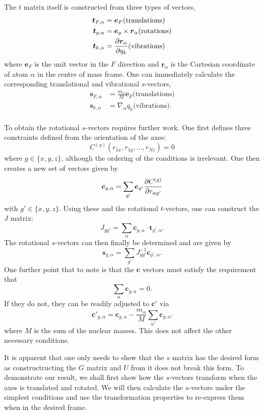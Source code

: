\documentclass{article}
\newcommand{\vect}[1]{\boldsymbol{#1}}
\begin{document}
The $t$ matrix itself is constructed from three types of vectors,
\[
\begin{split}
    \vect{t}_{F,\alpha} &= \vect{e}_F  \text{(translations)} \\
    \vect{t}_{g, \alpha} &= \vect{e}_g \times \vect{r}_\alpha \text{(rotations)} \\
    \vect{t}_{k,\alpha} &= \pdv{\vect{r}_\alpha}{q_k} \text{(vibrations)} 
\end{split}
\]
where $\vect{e}_F$ is the unit vector in the $F$ direction and $\vect{r}_\alpha$ is the Cartesian coordinate of atom $\alpha$ in the centre of mass frame. One can immediately calculate the corresponding translational and vibrational $s$-vectors,
\[
\begin{split}
    \vect{s}_{F,\alpha} &= \frac{m_\alpha}{M}\vect{e}_F \text{(translations)} \\
    \vect{s}_{k, \alpha} &= \nabla_\alpha q_k \text{(vibrations).} \\
\end{split}
\]

To obtain the rotational $s$-vectors requires further work. One first defines three constraints defined from the orientation of the axes: 
\[
C^{(g)}(r_{1x}, r_{1y}, \ldots, r_{Nz}) = 0
\]
where $g \in \{x,y,z\}$, although the ordering of the conditions is irrelevant. One then creates a new set of vectors given by 
\[
\vect{c}_{g, \alpha} = \sum_{g'}\vect{e}_{g'}\pdv{C^{(g)}}{r_{\alpha g'}}
\]
with $g' \in \{x,y,z\}$.  Using these and the rotational $t$-vectors, one can construct the $J$ matrix:  
\[
J_{g g'} = \sum_{\alpha} \vect{c}_{g, \alpha}\cdot  \vect{t}_{g', \alpha}.
\]
The rotational $s$-vectors can then finally be determined and are given by 
\[
\vect{s}_{g, \alpha} = \sum_{g'} J^{-1}_{g g'} \vect{c}_{g', \alpha}. 
\]
One further point that to note is that the $\vect{c}$ vectors must satisfy the requirement that
\[
\sum_{\alpha} \vect{c}_{g, \alpha} = 0.
\]
If they do not, they can be readily adjusted to $\vect{c}'$ via
\[
\vect{c}'_{g, \alpha} = \vect{c}_{g, \alpha} -\frac{m_\alpha}{M} \sum_{\alpha'} \vect{c}_{g, \alpha'} 
\]
where $M$ is the sum of the nuclear masses. This does not affect the other necessary conditions. 

It is apparent that one only needs to show that the $s$ matrix has the desired form as constructructing the $G$ matrix and $U$ from it does not break this form. To demonstrate our result, we shall first show how the $s$-vectors transform when the axes is translated and rotated. We will then calculate the $s$-vectors under the simplest conditions and use the transformation properties to re-express them when in the desired frame. 
\end{document}
